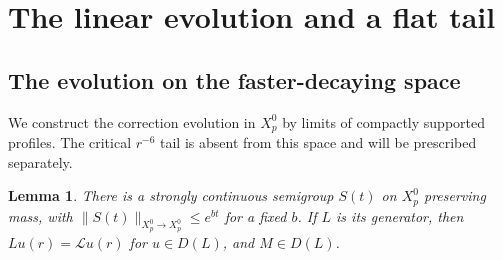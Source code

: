 \documentclass[11pt,a4paper]{article}
\numberwithin{equation}{section}
\newtheorem{lemma}[theorem]{Lemma}
\theoremstyle{remark}
\newcommand{\calL}{\mathcal L}
\newcommand{\norm}[2]{\lVert #1\rVert_{#2}}
\begin{document}
\section{The linear evolution and a flat tail}\label{sec:linear}

\subsection*{The evolution on the faster-decaying space}
We construct the correction evolution in \(X_p^0\) by limits of
compactly supported profiles. The critical \(r^{-6}\) tail is absent
from this space and will be prescribed separately.

\begin{lemma}\label{lem:semigroup}
There is a strongly continuous semigroup \(S(t)\) on \(X_p^0\) preserving
mass, with \(\norm{S(t)}{X_p^0\to X_p^0}\leq e^{bt}\) for a fixed \(b\).
If \(L\) is its generator, then
\(Lu(r)=\calL u(r)\) for \(u\in D(L)\), and \(M\in D(L)\).
\end{lemma}
\end{document}
